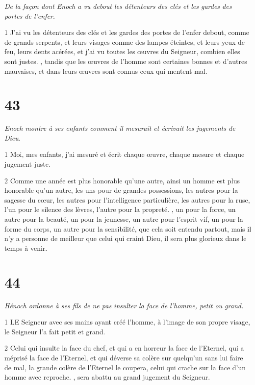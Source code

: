 \par \textit{De la façon dont Enoch a vu debout les détenteurs des clés et les gardes des portes de l'enfer.}

\par 1 J'ai vu les détenteurs des clés et les gardes des portes de l'enfer debout, comme de grands serpents, et leurs visages comme des lampes éteintes, et leurs yeux de feu, leurs dents acérées, et j'ai vu toutes les œuvres du Seigneur, combien elles sont justes. , tandis que les œuvres de l'homme sont certaines bonnes et d'autres mauvaises, et dans leurs œuvres sont connus ceux qui mentent mal.

\chapter{43}

\par \textit{Enoch montre à ses enfants comment il mesurait et écrivait les jugements de Dieu.}

\par 1 Moi, mes enfants, j'ai mesuré et écrit chaque œuvre, chaque mesure et chaque jugement juste.

\par 2 Comme une année est plus honorable qu'une autre, ainsi un homme est plus honorable qu'un autre, les uns pour de grandes possessions, les autres pour la sagesse du cœur, les autres pour l'intelligence particulière, les autres pour la ruse, l'un pour le silence des lèvres, l'autre pour la propreté. , un pour la force, un autre pour la beauté, un pour la jeunesse, un autre pour l'esprit vif, un pour la forme du corps, un autre pour la sensibilité, que cela soit entendu partout, mais il n'y a personne de meilleur que celui qui craint Dieu, il sera plus glorieux dans le temps à venir.

\chapter{44}

\par \textit{Hénoch ordonne à ses fils de ne pas insulter la face de l'homme, petit ou grand.}

\par 1 LE Seigneur avec ses mains ayant créé l'homme, à l'image de son propre visage, le Seigneur l'a fait petit et grand.

\par 2 Celui qui insulte la face du chef, et qui a en horreur la face de l'Eternel, qui a méprisé la face de l'Eternel, et qui déverse sa colère sur quelqu'un sans lui faire de mal, la grande colère de l'Eternel le coupera, celui qui crache sur la face d'un homme avec reproche. , sera abattu au grand jugement du Seigneur.

